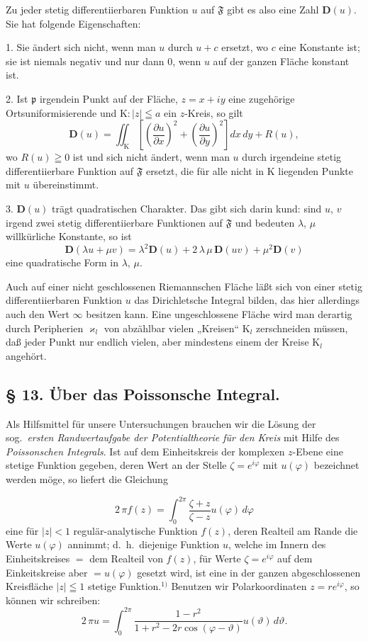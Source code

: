 \documentclass{article}
\begin{document}
Zu jeder stetig differentiierbaren Funktion $u$ auf $\mathfrak{F}$ gibt es also eine Zahl $\mathbf{D}(u)$. Sie hat folgende Eigenschaften:

1. Sie ändert sich nicht, wenn man $u$ durch $u + c$ ersetzt, wo $c$ eine Konstante ist; sie ist niemals negativ und nur dann $0$, wenn $u$ auf der ganzen Fläche konstant ist.

2. Ist $\mathfrak{p}$ irgendein Punkt auf der Fläche, $z = x + iy$ eine zugehörige Ortsuniformisierende und $\mathrm{K}\colon |z| \leqq a$ ein $z$-Kreis, so gilt
\[ \mathbf{D}(u) = \iint_{\mathrm{K}} \left[ \left(\frac{\partial u}{\partial x}\right)^2 + \left(\frac{\partial u}{\partial y}\right)^2 \right] dx\,dy + R(u), \]
wo $R(u) \geqq 0$ ist und sich nicht ändert, wenn man $u$ durch irgendeine stetig differentiierbare Funktion auf $\mathfrak{F}$ ersetzt, die für alle nicht in $\mathrm{K}$ liegenden Punkte mit $u$ übereinstimmt.

3. $\mathbf{D}(u)$ trägt quadratischen Charakter. Das gibt sich darin kund: sind $u$, $v$ irgend zwei stetig differentiierbare Funktionen auf $\mathfrak{F}$ und bedeuten $\lambda$, $\mu$ willkürliche Konstante, so ist
\[ \mathbf{D}(\lambda u + \mu v) = \lambda^2 \mathbf{D}(u) + 2\,\lambda\,\mu\,\mathbf{D}(uv) + \mu^2 \mathbf{D}(v) \]
eine quadratische Form in $\lambda$, $\mu$.

Auch auf einer nicht geschlossenen Riemannschen Fläche läßt sich von einer stetig differentiierbaren Funktion $u$ das Dirichletsche Integral bilden, das hier allerdings auch den Wert $\infty$ besitzen kann. Eine ungeschlossene Fläche wird man derartig durch Peripherien $\varkappa_l$ von abzählbar vielen „Kreisen“ $\mathrm{K}_l$ zerschneiden müssen, daß jeder Punkt nur endlich vielen, aber mindestens einem der Kreise $\mathrm{K}_l$ angehört.

\subsection*{§ 13. Über das Poissonsche Integral.}

Als Hilfsmittel für unsere Untersuchungen brauchen wir die Lösung der sog.\ \emph{ersten Randwertaufgabe der Potentialtheorie für den Kreis} mit Hilfe des \emph{Poissonschen Integrals}. Ist auf dem Einheitskreis der komplexen $z$-Ebene eine stetige Funktion gegeben, deren Wert an der Stelle $\zeta = e^{i\varphi}$ mit $u(\varphi)$ bezeichnet werden möge, so liefert die Gleichung

\[ 2\,\pi f(z) = \int_0^{2\pi} \frac{\zeta + z}{\zeta - z} u(\varphi)\,d\varphi \]
eine für $|z| < 1$ regulär-analytische Funktion $f(z)$, deren Realteil am Rande die Werte $u(\varphi)$ annimmt; d.~h.\ diejenige Funktion $u$, welche im Innern des Einheitskreises $=$ dem Realteil von $f(z)$, für Werte $\zeta = e^{i\varphi}$ auf dem Einkeitskreise aber $= u(\varphi)$ gesetzt wird, ist eine in der ganzen abgeschlossenen Kreisfläche $|z| \leqq 1$ stetige Funktion.${}^{1)}$ Benutzen wir Polarkoordinaten $z = r e^{i\varphi}$, so können wir schreiben:
\[ 2\,\pi u = \int_0^{2\pi} \frac{1 - r^2}{1 + r^2 - 2r \cos(\varphi - \vartheta)} u(\vartheta)\,d\vartheta. \tag{15} \]
\end{document}
